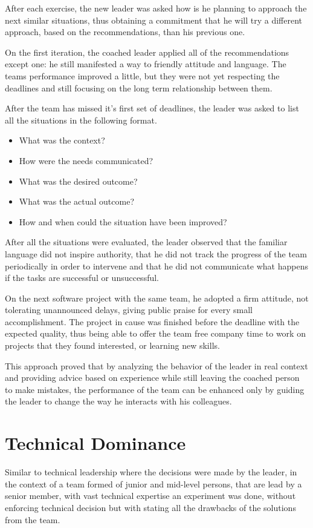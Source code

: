 After each exercise, the new leader was asked how is he planning to approach the next similar situations, thus obtaining a commitment that he will try a different approach, based on the recommendations,  than his previous one.

On the first iteration, the coached leader applied all of the recommendations except one: he still manifested a way to friendly attitude and language. The teams performance improved a little, but they were not yet respecting the deadlines and still focusing on the long term relationship between them. 

After the team has missed it's first set of deadlines, the leader was asked to list all the situations in the following format.
\begin{itemize}
\item What was the context?
\item How were the needs communicated?
\item What was the desired outcome?
\item What was the actual outcome?
\item How and when could the situation have been improved?
\end{itemize}

After all the situations were evaluated, the leader observed that 
the familiar language did not inspire authority, that he did not track the progress of the team periodically in order to intervene and that he did not communicate what happens if the tasks are successful or unsuccessful.

On the next software project with the same team, he adopted a firm attitude, not tolerating unannounced delays, giving public praise for every small accomplishment. The project in cause was finished before the deadline with the expected quality, thus being able to offer the team free company time to work on projects that they found interested, or learning new skills.

This approach proved that by analyzing the behavior of the leader in real context and providing advice based on experience while still leaving the coached person to make mistakes, the performance of the team can be enhanced only by guiding the leader to change the way he interacts with his colleagues.

\section{Technical Dominance}
\label{sec:tech-dom}
Similar to technical leadership where the decisions were made by the leader, in the context of a team formed of junior and mid-level persons, that are lead by a senior member, with vast technical expertise an experiment was done, without enforcing technical decision but with stating all the drawbacks of the solutions from the team.

